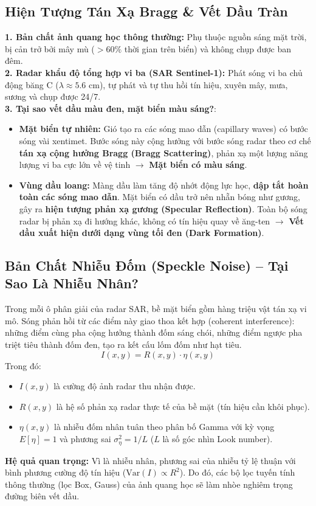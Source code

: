 \documentclass[11pt,a4paper]{article}
\begin{document}
\subsection{Hiện Tượng Tán Xạ Bragg \& Vết Dầu Tràn}
\begin{whyuse}
\textbf{1. Bản chất ảnh quang học thông thường:} Phụ thuộc nguồn sáng mặt trời, bị cản trở bởi mây mù ($> 60\%$ thời gian trên biển) và không chụp được ban đêm.\\
\textbf{2. Radar khẩu độ tổng hợp vi ba (SAR Sentinel-1):} Phát sóng vi ba chủ động băng C ($\lambda \approx 5.6\text{ cm}$), tự phát và tự thu hồi tín hiệu, xuyên mây, mưa, sương và chụp được 24/7.\\
\textbf{3. Tại sao vết dầu màu đen, mặt biển màu sáng?}:
\begin{itemize}
    \item \textbf{Mặt biển tự nhiên:} Gió tạo ra các sóng mao dẫn (capillary waves) có bước sóng vài xentimet. Bước sóng này cộng hưởng với bước sóng radar theo cơ chế \textbf{tán xạ cộng hưởng Bragg (Bragg Scattering)}, phản xạ một lượng năng lượng vi ba cực lớn về vệ tinh $\rightarrow$ \textbf{Mặt biển có màu sáng}.
    \item \textbf{Vùng dầu loang:} Màng dầu làm tăng độ nhớt động lực học, \textbf{dập tắt hoàn toàn các sóng mao dẫn}. Mặt biển có dầu trở nên nhẵn bóng như gương, gây ra \textbf{hiện tượng phản xạ gương (Specular Reflection)}. Toàn bộ sóng radar bị phản xạ đi hướng khác, không có tín hiệu quay về ăng-ten $\rightarrow$ \textbf{Vết dầu xuất hiện dưới dạng vùng tối đen (Dark Formation)}.
\end{itemize}
\end{whyuse}

\subsection{Bản Chất Nhiễu Đốm (Speckle Noise) -- Tại Sao Là Nhiễu Nhân?}
Trong mỗi ô phân giải của radar SAR, bề mặt biển gồm hàng triệu vật tán xạ vi mô. Sóng phản hồi từ các điểm này giao thoa kết hợp (coherent interference): những điểm cùng pha cộng hưởng thành đốm sáng chói, những điểm ngược pha triệt tiêu thành đốm đen, tạo ra kết cấu lốm đốm như hạt tiêu.
\begin{equation}
I(x, y) = R(x, y) \cdot \eta(x, y)
\end{equation}
Trong đó:
\begin{itemize}
    \item $I(x, y)$ là cường độ ảnh radar thu nhận được.
    \item $R(x, y)$ là hệ số phản xạ radar thực tế của bề mặt (tín hiệu cần khôi phục).
    \item $\eta(x, y)$ là nhiễu đốm nhân tuân theo phân bố Gamma với kỳ vọng $E[\eta] = 1$ và phương sai $\sigma_\eta^2 = 1/L$ ($L$ là số góc nhìn Look number).
\end{itemize}
\textbf{Hệ quả quan trọng:} Vì là nhiễu nhân, phương sai của nhiễu tỷ lệ thuận với bình phương cường độ tín hiệu ($\text{Var}(I) \propto R^2$). Do đó, các bộ lọc tuyến tính thông thường (lọc Box, Gauss) của ảnh quang học sẽ làm nhòe nghiêm trọng đường biên vết dầu.
\end{document}
